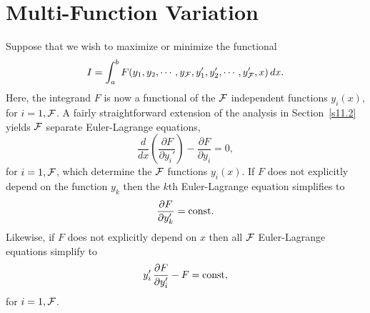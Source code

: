 \section{Multi-Function Variation}\label{s11.4}
Suppose that we wish to maximize or minimize the functional
\begin{equation}
I = \int_a^b F(y_1,y_2,\cdots,y_{\cal F},y_1',y_2',\cdots,y_{\cal F}',x)\,dx.
\end{equation}
Here, the integrand $F$ is now a functional of the ${\cal F}$ independent
functions $y_i(x)$, for $i=1,{\cal F}$. A fairly straightforward extension of the
analysis in Section~\ref{s11.2} yields ${\cal F}$ separate Euler-Lagrange equations,
\begin{equation}\label{e11.34}
\frac{d}{dx}\!\left(\frac{\partial F}{\partial y_i'}\right)-\frac{\partial F}{\partial y_i} = 0,
\end{equation}
for $i=1,{\cal F}$, which determine the ${\cal F}$ functions $y_i(x)$. If $F$ does not
explicitly depend on the function $y_k$ then the $k$th Euler-Lagrange
equation simplifies to
\begin{equation}
\frac{\partial F}{\partial y_k'} = {\rm const}.
\end{equation}
Likewise, if $F$ does not explicitly depend on $x$ then all ${\cal F}$ Euler-Lagrange equations simplify to
\begin{equation}
y_i'\,\frac{\partial F}{\partial y_i'} - F = {\rm const},
\end{equation}
for $i=1,{\cal F}$. 

